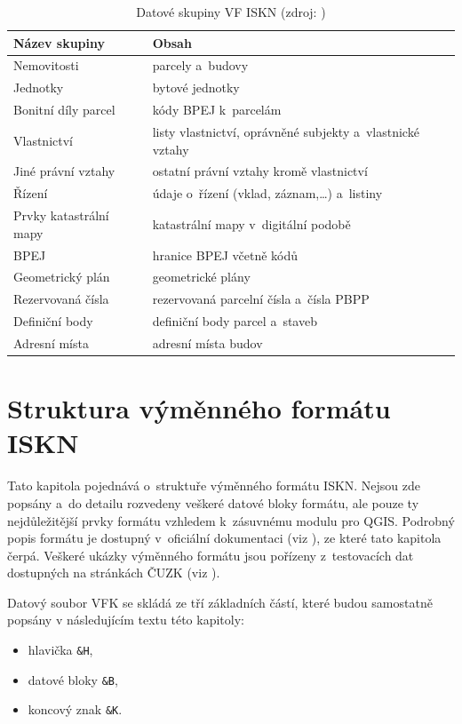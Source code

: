 \documentclass[a4paper,12pt,oneside]{book}
\begin{document}
\begin{table}[htbp]
\centering
\caption[Datové skupiny VF ISKN]{Datové skupiny VF ISKN (zdroj: \cite{nvf_cuzk})}
\begin{tabular}{ll}
\toprule
\textbf{Název skupiny} & \textbf{Obsah} \\ 
\midrule
Nemovitosti & parcely a~budovy \\ 
Jednotky & bytové jednotky \\ 
Bonitní díly parcel & kódy BPEJ k~parcelám \\ 
Vlastnictví & \parbox{220pt}{listy vlastnictví, oprávněné subjekty a~vlastnické vztahy} \\ 
Jiné právní vztahy & ostatní právní vztahy kromě vlastnictví \\ 
Řízení & údaje o~řízení (vklad, záznam,…) a~listiny \\ 
Prvky katastrální mapy & katastrální mapy v~digitální podobě \\ 
BPEJ & hranice BPEJ včetně kódů \\ 
Geometrický plán & geometrické plány \\ 
Rezervovaná čísla & rezervovaná parcelní čísla a~čísla PBPP \\ 
Definiční body & definiční body parcel a~staveb \\ 
Adresní místa & adresní místa budov \\
\bottomrule
\end{tabular}
\label{t_datove_skupiny}
\end{table}

\newpage
\section{Struktura výměnného formátu ISKN}

Tato kapitola pojednává o~struktuře výměnného formátu ISKN. Nejsou zde
popsány a~do detailu rozvedeny veškeré datové bloky formátu, ale pouze
ty nejdůležitější prvky formátu vzhledem k~zásuvnému modulu pro
QGIS. Podrobný popis formátu je dostupný v~oficiální dokumentaci
(viz \cite{vfk_struktura}), ze které tato kapitola čerpá. Veškeré ukázky
výměnného formátu jsou pořízeny z~testovacích dat dostupných na
stránkách ČUZK (viz \cite{nvf_cuzk}).

Datový soubor VFK se skládá ze tří základních částí, které
budou samostatně popsány v následujícím textu této kapitoly:

\begin{itemize}
 \item hlavička \texttt{\&H},
 \item datové bloky \texttt{\&B},
 \item koncový znak \texttt{\&K}.
\end{itemize}
\end{document}

